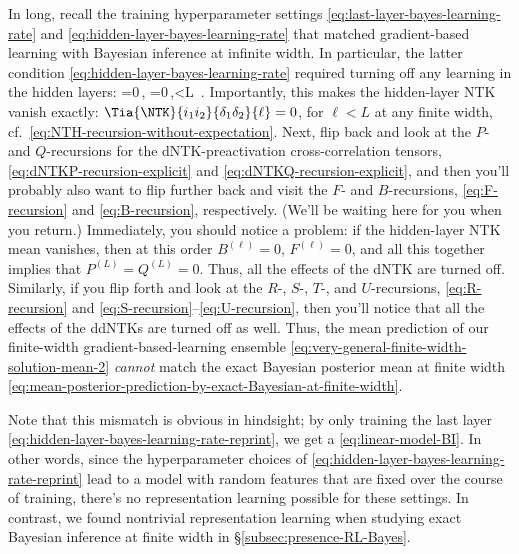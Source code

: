 In long, 
recall the training hyperparameter settings \eqref{eq:last-layer-bayes-learning-rate} and \eqref{eq:hidden-layer-bayes-learning-rate} that matched gradient-based learning with Bayesian inference at infinite width. In particular, the latter condition \eqref{eq:hidden-layer-bayes-learning-rate} required turning off any learning in the hidden layers:
\be\label{eq:hidden-layer-bayes-learning-rate-reprint}
\Lb{\ell}=0\,, \qquad \LW{\ell}=0\,,\qquad {}\quad \ell <L\, .
\ee
Importantly, this makes the hidden-layer NTK vanish exactly: $\Tia{\NTK}{i_1i_2}{\delta_1\delta_2}{\ell} = 0$, for $\ell <L$ at any finite width, cf.~\eqref{eq:NTH-recursion-without-expectation}.
Next, flip back and look at the $P$- and $Q$-recursions for the dNTK-preactivation cross-correlation tensors, \eqref{eq:dNTKP-recursion-explicit} and \eqref{eq:dNTKQ-recursion-explicit}, and then you'll probably also want to flip further back and visit the $F$- and $B$-recursions, \eqref{eq:F-recursion} and \eqref{eq:B-recursion}, respectively.
(We'll be  waiting here for you when you return.) Immediately, you should notice a problem: if the hidden-layer NTK mean vanishes, then at this order $B^{(\ell)}=0$, $F^{(\ell)}=0$, and all this together implies that $P^{(L)}=Q^{(L)}=0$. Thus, all the effects of the dNTK are turned off. Similarly, if you flip forth and look at the $R$-, $S$-, $T$-, and $U$-recursions, \eqref{eq:R-recursion} and \eqref{eq:S-recursion}--\eqref{eq:U-recursion}, then you'll notice that all the effects of the ddNTKs are turned off as well.
Thus, the mean prediction of our finite-width gradient-based-learning ensemble \eqref{eq:very-general-finite-width-solution-mean-2} \emph{cannot} match the exact Bayesian posterior mean at finite width \eqref{eq:mean-posterior-prediction-by-exact-Bayesian-at-finite-width}.

Note that this mismatch is obvious in hindsight; by only training the last layer \eqref{eq:hidden-layer-bayes-learning-rate-reprint}, we get a  \eqref{eq:linear-model-BI}.
In other words, since the hyperparameter choices of \eqref{eq:hidden-layer-bayes-learning-rate-reprint} lead to a model with random features that are fixed over the course of training, there's no representation learning possible for these settings.
In contrast, we found nontrivial representation learning when studying exact Bayesian inference at finite width in \S\ref{subsec:presence-RL-Bayes}.



